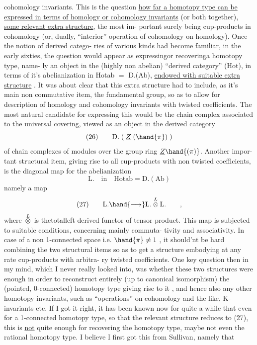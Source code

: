 
cohomology invariants.  This is the question  \uline{how far a homotopy
type can be expressed in terms of homology or cohomology invariants}
(or both together),   \uline{some relevant extra structure},  the most im-%
portant surely being cup-products in cohomology (or, dually, ``interior''
operation of cohomology on homology).  Once the notion of derived catego-%
ries of various kinds had become familiar,  in the early sixties,  the
question would appear as expressing\hand{,}or recovering\hand{,}a homotopy type,  name-%
ly an object in the (highly non abelian) ``derived category'' (Hot),  in
terms of it's abelianization in  Hotab $=$ D.(Ab),  \uline{endowed with suitable
extra structure} .  It was about clear that this extra structure had to
include,  as it's main non commutative item,  the fundamental group\inserted{$\pi$},
so as to allow for description of homology and cohomology invariants
with twisted coefficients.  The most natural candidate for expressing
this would be the chain complex associated to the universal covering,
viewed as an object in the derived category
\[ \text{(26)} \qquad \mathrm{D.}\;(\;\underline{Z}\;(\hand{\pi})\;) \]
of chain complexes of modules over the group ring $\underline{Z}\hand{(\pi)}$.  Another impor-%
tant structural item,  giving rise to all cup-products with non twisted
coefficients,  is the diagonal map  for the abelianization
\[ \mathrm{L.}\quad\text{in}\quad \mathrm{Hotab} = \mathrm{D.(Ab)} \]
namely a map
\[ \text{(27)} \qquad \mathrm{L.} \hand{\longrightarrow} \mathrm{L.} \overset{L}{\otimes} \mathrm{L.} \qquad , \]
where $\overset{L}{\otimes}$ is thetotalleft derived functor of tensor product.  This
map is subjected to  suitable  conditions,  concerning mainly commuta-%
tivity and associativity.  In case of a non  1-connected space
i.e. $\hand{\pi} \neq 1$ ,  it should'nt be hard combining the two structural items
so as to get a structure embodying at any rate cup-products with arbitra-%
ry twisted coefficients.   One key question then in my mind,  which I
never really looked into,  was whether these two structures were enough
in order to reconstruct entirely (up to canonical isomorphism) the
(pointed, 0-connected)  homotopy type  giving rise to it ,  and hence
also any other homotopy invariants,  such as ``operations'' on cohomology
and the like,  K-invariants etc. \hand{$\|$}\margin{$\ulcorner$}If I got it right,  it  has been
known now for quite a while that even for a 1-connected homotopy type,
so that the relevant structure reduces to (27),   this is \uline{not} quite
enough for recovering the homotopy type,  maybe not even the rational
homotopy type.  I believe I first got this from Sullivan,  namely that

